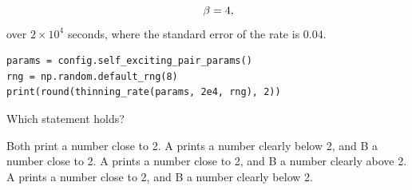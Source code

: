 \begin{question}
\begin{equation*}
 \qquad
 \beta = 4,
\end{equation*}
over $2 \times 10^{4}$ seconds,
where the standard error of the rate is $0.04$.
\begin{lstlisting}[caption={Run once with each alternative}, label=listing.thinningBoundAfterTheJumpRun]
params = config.self_exciting_pair_params()
rng = np.random.default_rng(8)
print(round(thinning_rate(params, 2e4, rng), 2))
\end{lstlisting}
Which statement holds?
\begin{choices}
 \choice Both print a number close to 2.
 \choice A prints a number clearly below 2, and B a number close to 2.
 \choice A prints a number close to 2, and B a number clearly above 2.
 \correctchoice A prints a number close to 2, and B a number clearly below 2.
\end{choices}
\end{question}

